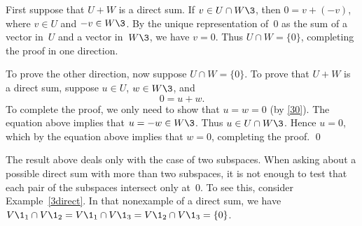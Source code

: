 \proof
First suppose that $U + W$ is a direct sum.  If $v \in U \cap W\3$, then $0 = v + (-v)$, where $v \in U$ and
$-v \in W\3$.  By the unique representation of~$0$ as the sum of a vector in~$U$
and a vector in~$W\3$, we have $v = 0$.  Thus $U \cap W = \{0\}$, completing
the proof in one direction.

To prove the other direction, now suppose $U \cap W =
\{0\}$.  To prove that $U + W$ is a direct sum, suppose $u \in U$, $w \in W\3$, and
\[
0 = u + w.
\]
To complete the proof, we only need to show that
$u = w = 0$ (by \ref{30}).   The equation above implies that $u = -w \in W\3$.  Thus
$u \in U \cap W\3$. Hence $u = 0$, which by the equation above implies
that $w = 0$, completing the proof.
\qed


The result above deals only with the
case of two subspaces.  When
asking about a possible direct sum with more
than two subspaces, it is not enough to test that each pair of the subspaces
intersect only at~$0$.  To see this, consider Example~\ref{3direct}.  In that nonexample of a direct sum, we have
$V\1_1 \cap V\1_2 = V\1_1 \cap V\1_3 = V\1_2 \cap V\1_3 = \{0\}$.

